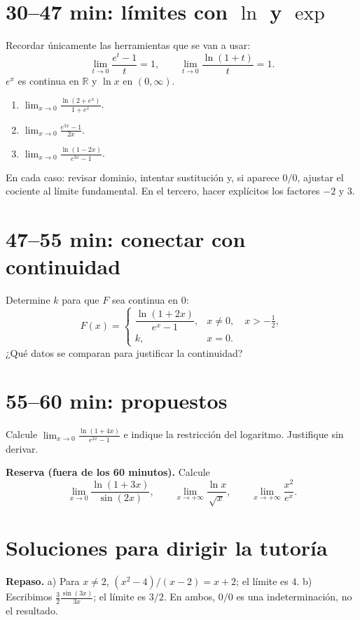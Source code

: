 \documentclass[10pt,a5paper]{article}
\newif\ifmostrarSoluciones
\begin{document}
\section*{30--47 min: límites con $\ln$ y $\exp$}
Recordar únicamente las herramientas que se van a usar:
\[
 \lim_{t\to0}\frac{e^t-1}{t}=1,
 \qquad
 \lim_{t\to0}\frac{\ln(1+t)}{t}=1.
\]
$e^x$ es continua en $\mathbb R$ y $\ln x$ en $(0,\infty)$.
\begin{ejercicios}
\begin{enumerate}
  \item $\displaystyle\lim_{x\to0}\frac{\ln(2+e^x)}{1+e^x}$.
  \item $\displaystyle\lim_{x\to0}\frac{e^{3x}-1}{2x}$.
  \item $\displaystyle\lim_{x\to0}\frac{\ln(1-2x)}{e^{3x}-1}$.
\end{enumerate}
En cada caso: revisar dominio, intentar sustitución y, si aparece $0/0$, ajustar el cociente al límite fundamental. En el tercero, hacer explícitos los factores $-2$ y $3$.
\end{ejercicios}

\section*{47--55 min: conectar con continuidad}
\begin{ejercicios}
Determine $k$ para que $F$ sea continua en $0$:
\[
 F(x)=\begin{cases}
 \dfrac{\ln(1+2x)}{e^x-1},&x\ne0,\quad x>-\tfrac12,\\[5pt]
 k,&x=0.
 \end{cases}
\]
¿Qué datos se comparan para justificar la continuidad?
\end{ejercicios}

\section*{55--60 min: propuestos}
Calcule $\displaystyle\lim_{x\to0}\frac{\ln(1+4x)}{e^{2x}-1}$ e indique la restricción del logaritmo. Justifique sin derivar.

\textbf{Reserva (fuera de los 60 minutos).} Calcule
\[
 \lim_{x\to0}\frac{\ln(1+3x)}{\sin(2x)},\qquad
 \lim_{x\to+\infty}\frac{\ln x}{\sqrt{x}},\qquad
 \lim_{x\to+\infty}\frac{x^2}{e^x}.
\]

\ifmostrarSoluciones
\newpage
\section*{Soluciones para dirigir la tutoría}
\textbf{Repaso.} a) Para $x\ne2$, $(x^2-4)/(x-2)=x+2$; el límite es $4$. b) Escribimos $\frac32\frac{\sin(3x)}{3x}$; el límite es $3/2$. En ambos, $0/0$ es una indeterminación, no el resultado.
\end{document}
